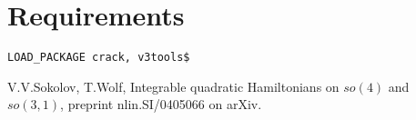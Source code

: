 \documentclass[12pt]{article}
\begin{document}
\section{Requirements}
\verb+LOAD_PACKAGE crack, v3tools$+

\begin{thebibliography}{99}
 V.V.Sokolov, T.Wolf, Integrable quadratic Hamiltonians on
                 $so(4)$ and $so(3,1)$, preprint nlin.SI/0405066 on arXiv.
\end{thebibliography}
\end{document}
